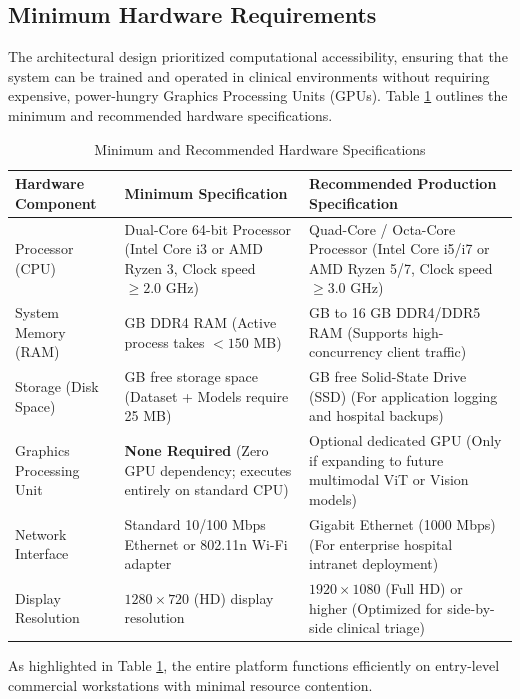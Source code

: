 \subsection{Minimum Hardware Requirements}

The architectural design prioritized computational accessibility, ensuring that the system can be trained and operated in clinical environments without requiring expensive, power-hungry Graphics Processing Units (GPUs). Table \ref{tab:hardware_requirements} outlines the minimum and recommended hardware specifications.

\begin{table}[H]
\centering
\small
\begin{tabularx}{\linewidth}{|>{\raggedright\arraybackslash}p{3.8cm}|>{\raggedright\arraybackslash}p{4.0cm}|>{\raggedright\arraybackslash}X|}
\hline
\textbf{Hardware Component} & \textbf{Minimum Specification} & \textbf{Recommended Production Specification} \\
\hline
Processor (CPU) & Dual-Core 64-bit Processor \newline (Intel Core i3 or AMD Ryzen 3, \newline Clock speed $\ge 2.0$ GHz) & Quad-Core / Octa-Core Processor \newline (Intel Core i5/i7 or AMD Ryzen 5/7, \newline Clock speed $\ge 3.0$ GHz) \\
\hline
System Memory (RAM) & 4 GB DDR4 RAM \newline (Active process takes $< 150$ MB) & 8 GB to 16 GB DDR4/DDR5 RAM \newline (Supports high-concurrency client traffic) \\
\hline
Storage (Disk Space) & 2 GB free storage space \newline (Dataset + Models require 25 MB) & 20 GB free Solid-State Drive (SSD) \newline (For application logging and hospital backups) \\
\hline
Graphics Processing Unit & \textbf{None Required} \newline (Zero GPU dependency; executes entirely on standard CPU) & Optional dedicated GPU \newline (Only if expanding to future multimodal ViT or Vision models) \\
\hline
Network Interface & Standard 10/100 Mbps Ethernet or 802.11n Wi-Fi adapter & Gigabit Ethernet (1000 Mbps) \newline (For enterprise hospital intranet deployment) \\
\hline
Display Resolution & $1280 \times 720$ (HD) display resolution & $1920 \times 1080$ (Full HD) or higher \newline (Optimized for side-by-side clinical triage) \\
\hline
\end{tabularx}
\caption{Minimum and Recommended Hardware Specifications}
\label{tab:hardware_requirements}
\end{table}

As highlighted in Table \ref{tab:hardware_requirements}, the entire platform functions efficiently on entry-level commercial workstations with minimal resource contention.

